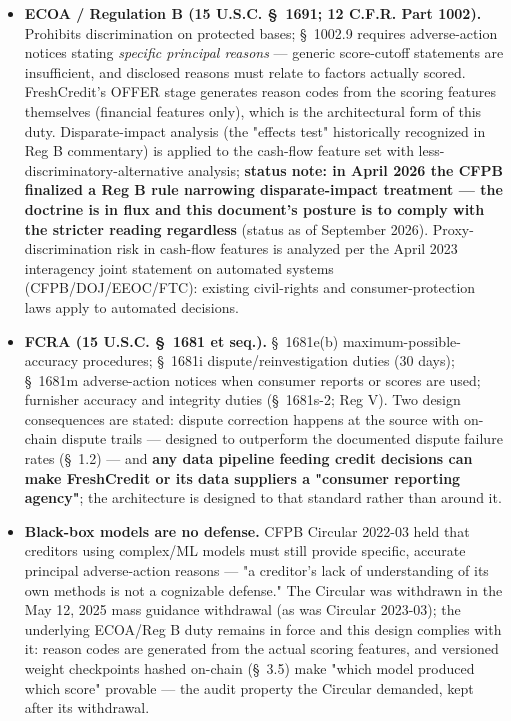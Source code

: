 \documentclass[11pt,twocolumn]{article}
\begin{document}
\begin{itemize}
\item \textbf{ECOA / Regulation B (15 U.S.C. \S~1691; 12 C.F.R. Part 1002).} Prohibits discrimination on protected bases; \S~1002.9 requires adverse-action notices stating \emph{specific principal reasons} --- generic score-cutoff statements are insufficient, and disclosed reasons must relate to factors actually scored. FreshCredit's OFFER stage generates reason codes from the scoring features themselves (financial features only), which is the architectural form of this duty. Disparate-impact analysis (the "effects test" historically recognized in Reg B commentary) is applied to the cash-flow feature set with less-discriminatory-alternative analysis; \textbf{status note: in April 2026 the CFPB finalized a Reg B rule narrowing disparate-impact treatment --- the doctrine is in flux and this document's posture is to comply with the stricter reading regardless} (status as of September 2026). Proxy-discrimination risk in cash-flow features is analyzed per the April 2023 interagency joint statement on automated systems (CFPB/DOJ/EEOC/FTC): existing civil-rights and consumer-protection laws apply to automated decisions.
\item \textbf{FCRA (15 U.S.C. \S~1681 et seq.).} \S~1681e(b) maximum-possible-accuracy procedures; \S~1681i dispute/reinvestigation duties (30 days); \S~1681m adverse-action notices when consumer reports or scores are used; furnisher accuracy and integrity duties (\S~1681s-2; Reg V). Two design consequences are stated: dispute correction happens at the source with on-chain dispute trails --- designed to outperform the documented dispute failure rates (\S~1.2) --- and \textbf{any data pipeline feeding credit decisions can make FreshCredit or its data suppliers a "consumer reporting agency"}; the architecture is designed to that standard rather than around it.
\item \textbf{Black-box models are no defense.} CFPB Circular 2022-03 held that creditors using complex/ML models must still provide specific, accurate principal adverse-action reasons --- "a creditor's lack of understanding of its own methods is not a cognizable defense." The Circular was withdrawn in the May 12, 2025 mass guidance withdrawal (as was Circular 2023-03); the underlying ECOA/Reg B duty remains in force and this design complies with it: reason codes are generated from the actual scoring features, and versioned weight checkpoints hashed on-chain (\S~3.5) make "which model produced which score" provable --- the audit property the Circular demanded, kept after its withdrawal.

\end{itemize}
\end{document}

